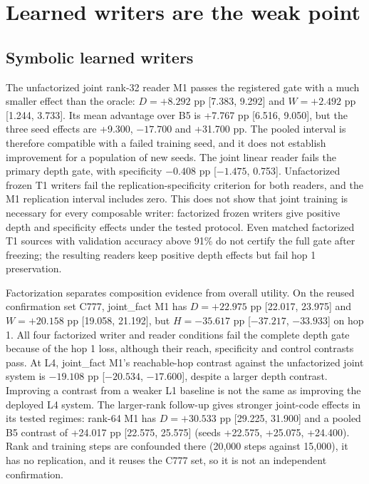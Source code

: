 \section{Learned writers are the weak point}
\label{sec:writers}

\subsection{Symbolic learned writers}

The unfactorized joint rank-32 reader M1 passes the registered gate with a much smaller effect than the oracle: $D=+8.292$ pp [7.383, 9.292] and $W=+2.492$ pp [1.244, 3.733].  %
Its mean advantage over B5 is +7.767 pp [6.516, 9.050], but the three seed effects are +9.300, $-17.700$ and +31.700 pp.  %
The pooled interval is therefore compatible with a failed training seed, and it does not establish improvement for a population of new seeds.  %
The joint linear reader fails the primary depth gate, with specificity $-0.408$ pp [$-1.475$, 0.753].  %
Unfactorized frozen T1 writers fail the replication-specificity criterion for both readers, and the M1 replication interval includes zero.  %
This does not show that joint training is necessary for every composable writer: factorized frozen writers give positive depth and specificity effects under the tested protocol.  %
Even matched factorized T1 sources with validation accuracy above 91\% do not certify the full gate after freezing; the resulting readers keep positive depth effects but fail hop 1 preservation.  %

Factorization separates composition evidence from overall utility.
On the reused confirmation set C777, joint\_fact M1 has $D=+22.975$ pp [22.017, 23.975] and $W=+20.158$ pp [19.058, 21.192], but $H=-35.617$ pp [$-37.217$, $-33.933$] on hop 1.  %
All four factorized writer and reader conditions fail the complete depth gate because of the hop 1 loss, although their reach, specificity and control contrasts pass.  %
At L4, joint\_fact M1's reachable-hop contrast against the unfactorized joint system is $-19.108$ pp [$-20.534$, $-17.600$], despite a larger depth contrast.  %
Improving a contrast from a weaker L1 baseline is not the same as improving the deployed L4 system.
The larger-rank follow-up gives stronger joint-code effects in its tested regimes: rank-64 M1 has $D=+30.533$ pp [29.225, 31.900] and a pooled B5 contrast of +24.017 pp [22.575, 25.575] (seeds +22.575, +25.075, +24.400).  %
Rank and training steps are confounded there (20,000 steps against 15,000), it has no replication, and it reuses the C777 set, so it is not an independent confirmation.  %

